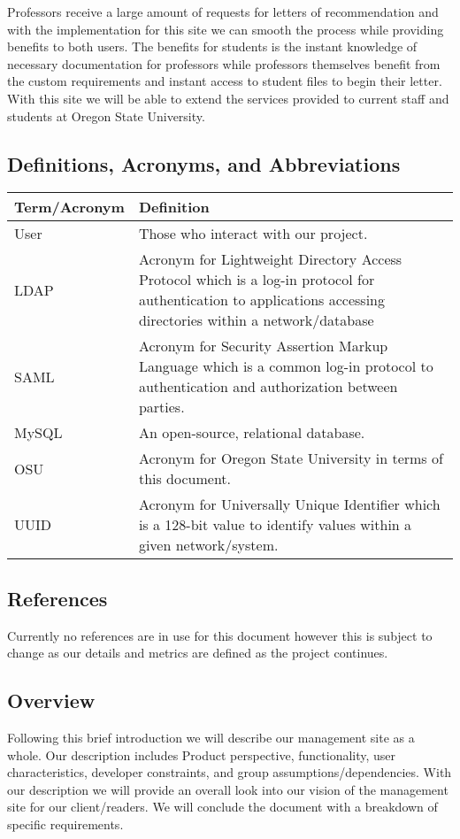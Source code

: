 \documentclass[onecolumn, draftclsnofoot,10pt, compsoc]{IEEEtran}
\begin{document}
Professors receive a large amount of requests for letters of recommendation and with the implementation for this site we can smooth the process while providing benefits to both users. The benefits for students is the instant knowledge of necessary documentation for professors while professors themselves benefit from the custom requirements and instant access to student files to begin their letter. With this site we will be able to extend the services provided to current staff and students at Oregon State University. 

\subsection{Definitions, Acronyms, and Abbreviations}
  \begin{tabu} to 
        \hline
        \textbf{Term/Acronym} & \textbf{Definition}\\
        \hline
        User & Those who interact with our project. \\
        \hline
        LDAP & Acronym for Lightweight Directory Access Protocol which is a log-in protocol for authentication to applications accessing directories within a network/database\\
        \hline
        SAML & Acronym for Security Assertion Markup Language which is a common log-in protocol to authentication and authorization between parties.\\
        \hline
        MySQL & An open-source, relational database.\\
        \hline
        OSU & Acronym for Oregon State University in terms of this document.\\
        \hline
        UUID & Acronym for Universally Unique Identifier which is a 128-bit value to identify values within a given network/system.\\
        \hline
\end{tabu}


\subsection{References}
Currently no references are in use for this document however this is subject to change as our details and metrics are defined as the project continues.

\subsection{Overview}
Following this brief introduction we will describe our management site as a whole. Our description includes Product perspective, functionality, user characteristics, developer constraints, and group assumptions/dependencies. With our description we will provide an overall look into our vision of the management site for our client/readers. We will conclude the document with a breakdown of specific requirements.
\end{document}
